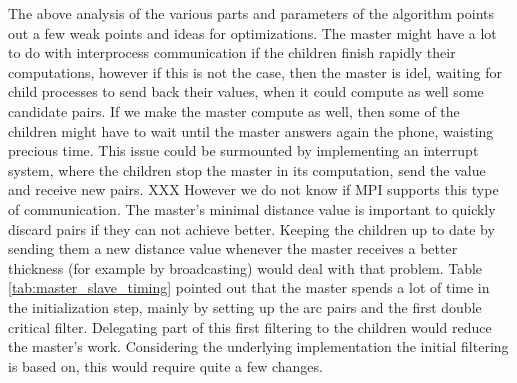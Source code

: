 \documentclass{article}
\begin{document}
The above analysis of the various parts and parameters of the algorithm
points out a few weak points and ideas for optimizations. The master might
have a lot to do with interprocess communication if the children finish
rapidly their computations, however if this is not the case, then the
master is idel, waiting for child processes to send back their values,
when it could compute as well some candidate pairs. If we make the master
compute as well, then some of the children might have to wait until the
master answers again the phone, waisting precious time. This issue could
be surmounted by implementing an interrupt system, where the children
stop the master in its computation, send the value and receive new pairs.
XXX However we do not know if MPI supports this type of communication.
The master's minimal distance value is important to quickly discard
pairs if they can not achieve better. Keeping the children up to date
by sending them a new distance value whenever the master receives a
better thickness (for example by broadcasting) would deal with that problem. 
Table \ref{tab:master_slave_timing} pointed out that the master
spends a lot of time in the initialization step, mainly by setting up the
arc pairs and the first double critical filter. Delegating part of this
first filtering to the children would reduce the master's work. Considering
the underlying implementation the initial filtering is based on, this
would require quite a few changes.
\end{document}
